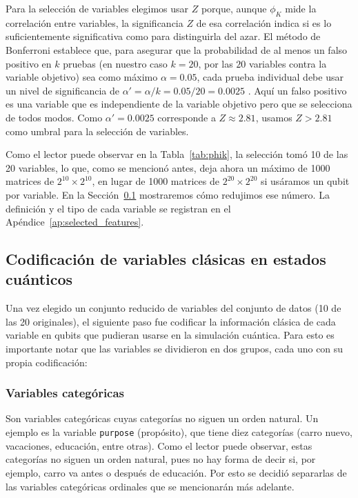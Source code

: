 \documentclass{ieeeaccess}
\begin{document}
Para la selección de variables elegimos usar $Z$ porque, aunque $\phi_{K}$ mide la correlación entre variables, la significancia $Z$ de esa correlación indica si es lo suficientemente significativa como para distinguirla del azar. El método de Bonferroni establece que, para asegurar que la probabilidad de al menos un falso positivo en $k$ pruebas (en nuestro caso $k = 20$, por las $20$ variables contra la variable objetivo) sea como máximo $\alpha = 0.05$, cada prueba individual debe usar un nivel de significancia de $\alpha' = \alpha/k = 0.05/20 = 0.0025$ \cite{bland1995multiple}. Aquí un falso positivo es una variable que es independiente de la variable objetivo pero que se selecciona de todos modos. Como $\alpha' = 0.0025$ corresponde a $Z \approx 2.81$, usamos $Z > 2.81$ como umbral para la selección de variables.

Como el lector puede observar en la Tabla~\ref{tab:phik}, la selección tomó 10 de las 20 variables, lo que, como se mencionó antes, deja ahora un máximo de 1000 matrices de $2^{10} \times 2^{10}$, en lugar de 1000 matrices de $2^{20} \times 2^{20}$ si usáramos un qubit por variable. En la Sección~\ref{subsec:encoding_variables} mostraremos cómo redujimos ese número. La definición y el tipo de cada variable se registran en el Apéndice~\ref{ap:selected_features}.

\subsection{Codificación de variables clásicas en estados cuánticos}
\label{subsec:encoding_variables}

Una vez elegido un conjunto reducido de variables del conjunto de datos (10 de las 20 originales), el siguiente paso fue codificar la información clásica de cada variable en qubits que pudieran usarse en la simulación cuántica. Para esto es importante notar que las variables se dividieron en dos grupos, cada uno con su propia codificación:

\subsubsection{Variables categóricas}

Son variables categóricas cuyas categorías no siguen un orden natural. Un ejemplo es la variable \texttt{purpose} (propósito), que tiene diez categorías (carro nuevo, vacaciones, educación, entre otras). Como el lector puede observar, estas categorías no siguen un orden natural, pues no hay forma de decir si, por ejemplo, carro va antes o después de educación. Por esto se decidió separarlas de las variables categóricas ordinales que se mencionarán más adelante.
\end{document}
